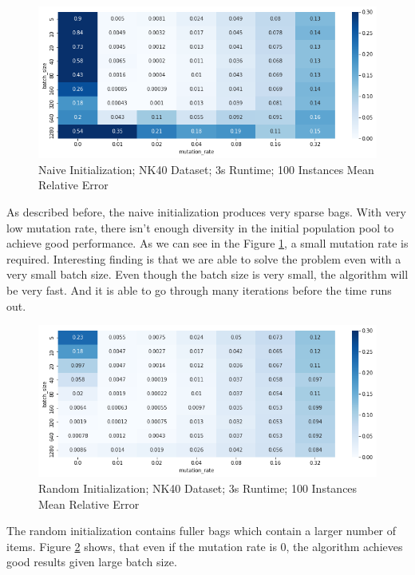 \documentclass[a4paper,10pt]{article}
\begin{document}
\begin{figure}[!htb]
	\centering
  	\includegraphics[width=\textwidth]{images/pilot_naive.png}
	\caption{Naive Initialization; NK40 Dataset; 3s Runtime; 100 Instances Mean Relative Error}
	\label{pilot_naive}
\end{figure}

As described before, the naive initialization produces very sparse bags. With very low mutation rate, there isn't enough diversity in the initial population pool to achieve good performance. As we can see in the Figure \ref{pilot_naive}, a small mutation rate is required. Interesting finding is that we are able to solve the problem even with a very small batch size. Even though the batch size is very small, the algorithm will be very fast. And it is able to go through many iterations before the time runs out.

\begin{figure}[!htb]
	\centering
  	\includegraphics[width=\textwidth]{images/pilot_random.png}
	\caption{Random Initialization; NK40 Dataset; 3s Runtime; 100 Instances Mean Relative Error}
	\label{pilot_random}
\end{figure}

The random initialization contains fuller bags which contain a larger number of items. Figure \ref{pilot_random} shows, that even if the mutation rate is $0$, the algorithm achieves good results given large batch size. 
\end{document}
